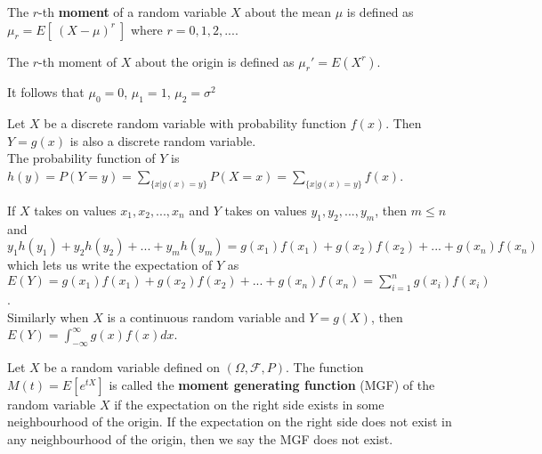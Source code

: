 \begin{defn}
    The $r$-th \textbf{moment} of a random variable $X$ about the mean $\mu$ is defined as $\mu_r = E[\  (X - \mu)^r \ ]$ where $r=0, 1, 2, ...$.

    The $r$-th moment of $X$ about the origin is defined as $\mu_r ' = E(X^r)$.
\end{defn}

It follows that $\mu_0 = 0$, $\mu_1 = 1$, $\mu_2 = \sigma ^2$

\begin{samepage}
\begin{thm}
    Let $X$ be a discrete random variable with probability function $f(x)$. Then $Y = g(x)$ is also a discrete random variable. \\ The probability function of $Y$ is $h(y) = P(Y = y) = \sum_{ \{x | g(x) = y \} } P(X = x) = \sum_{ \{x | g(x) = y \} } f(x)$.

    If $X$ takes on values $x_1, x_2, ..., x_n$  and $Y$ takes on values $y_1, y_2, ..., y_m$, then $m \leq n$ and $y_1 h(y_1) + y_2 h(y_2) + ... + y_m h(y_m) = g(x_1) f(x_1) + g(x_2) f(x_2) + ... + g(x_n) f(x_n)$ which lets us write the expectation of $Y$ as \\ $E(Y) = g(x_1)f(x_1) + g(x_2)f(x_2) + ... + g(x_n)f(x_n) = \sum_{i=1}^n g(x_i)f(x_i)$.
    \\ 

    Similarly when $X$ is a continuous random variable and $Y=g(X)$, then $E(Y) = \int_{- \infty}^{\infty} g(x) f(x) dx$.
\end{thm}
\end{samepage}

\begin{defn}
    Let $X$ be a random variable defined on $\left (\Omega,  \mathcal{F}, P\right )$. The function $M\left (t\right ) = E\left [e ^{t X}\right ]$ is called the \textbf{moment generating function} (MGF) of the random variable $X$ if the expectation on the right side exists in some neighbourhood of the origin. If the expectation on the right side does not exist in any neighbourhood of the origin, then we say the MGF does not exist.
\end{defn}

